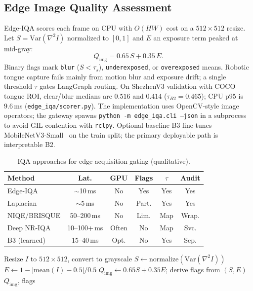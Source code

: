 \subsection{Edge Image Quality Assessment}
\label{sec:edge-iqa}

Edge-IQA scores each frame on CPU with $O(HW)$ cost on a $512\times512$ resize.
Let $S=\mathrm{Var}(\nabla^2 I)$ normalized to $[0,1]$ and $E$ an exposure term peaked at mid-gray:
\begin{equation}
Q_{\mathrm{img}} = 0.65\, S + 0.35\, E .
\end{equation}
Binary flags mark \texttt{blur} ($S<\tau_s$), \texttt{underexposed}, or \texttt{overexposed} means.
Robotic tongue capture fails mainly from motion blur and exposure drift; a single threshold $\tau$ gates LangGraph routing.
On ShezhenV3 validation with COCO tongue ROI, clear/blur medians are $0.516$ and $0.414$ ($\tau_{B2}{=}0.465$); CPU p95 is 9.6\,ms (\texttt{edge\_iqa/scorer.py}).
The implementation uses OpenCV-style image operators; the gateway spawns \texttt{python -m edge\_iqa.cli --json} in a subprocess to avoid GIL contention with \texttt{rclpy}.
Optional baseline B3 fine-tunes MobileNetV3-Small~\cite{howard2019mobilenetv3} on the train split; the primary deployable path is interpretable B2.

\begin{table}[!t]
\centering
\caption{IQA approaches for edge acquisition gating (qualitative).}
\label{tab:iqa-compare}
\small
\setlength{\tabcolsep}{3pt}
\begin{tabular}{lccccc}
\hline
Method & Lat. & GPU & Flags & $\tau$ & Audit \\
\hline
Edge-IQA & $\sim$10\,ms & No & Yes & Yes & Yes \\
Laplacian & $\sim$5\,ms & No & Part. & Yes & Yes \\
NIQE/BRISQUE & 50--200\,ms & No & Lim. & Map & Wrap. \\
Deep NR-IQA & 10--100+\,ms & Often & No & Map & Svc. \\
B3 (learned) & 15--40\,ms & Opt. & No & Yes & Sep. \\
\hline
\end{tabular}
\end{table}

\begin{algorithm}[!t]
\caption{Edge-IQA scoring}
\label{alg:edge-iqa}
\begin{algorithmic}[1]
\STATE Resize $I$ to $512\times512$, convert to grayscale
\STATE $S \leftarrow \mathrm{normalize}(\mathrm{Var}(\nabla^2 I))$
\STATE $E \leftarrow 1 - | \mathrm{mean}(I) - 0.5 | / 0.5$
\STATE $Q_{\mathrm{img}} \leftarrow 0.65 S + 0.35 E$; derive flags from $(S,E)$
\STATE \RETURN $Q_{\mathrm{img}}$, flags
\end{algorithmic}
\end{algorithm}
